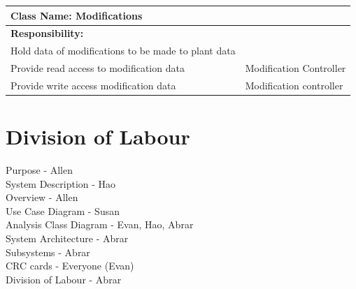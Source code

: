 \documentclass[]{article}
\begin{document}
		\centering
		\begin{tabular}{|p{7cm}|p{7cm}|}
		\hline 
		 \multicolumn{2}{|l|}{\textbf{Class Name: Modifications}} \\
		\hline
		\textbf{Responsibility:} & \text{Collaborators:} \\
		\hline
		Hold data of modifications to be made to plant data & \\
		\hline
		Provide read access to modification data & Modification Controller \\
		\hline 
		Provide write access modification data & Modification controller \\
		\hline
		\end{tabular}
	\newline
	\vspace*{0.5 cm}
	\newline

\newpage
\appendix
\section{Division of Labour}
\label{sec:division_of_labour}

Purpose - Allen\\
System Description - Hao \\
Overview - Allen\\
Use Case Diagram - Susan\\
Analysis Class Diagram - Evan, Hao, Abrar\\
System Architecture - Abrar \\
Subsystems - Abrar\\
CRC cards - Everyone (Evan)\\
Division of Labour - Abrar\\

\end{document}
